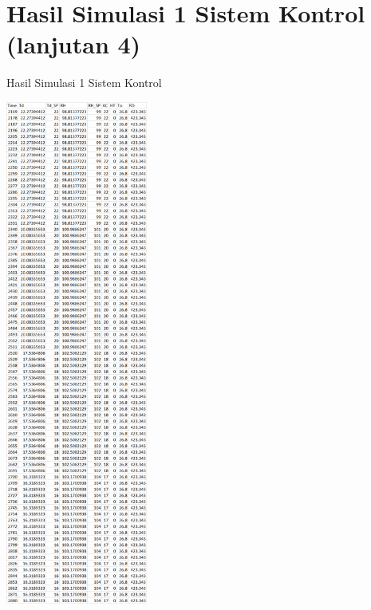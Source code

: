\section{Hasil Simulasi 1 Sistem Kontrol (lanjutan 4)}
\begin{table}[!h]
	\caption{Hasil Simulasi 1 Sistem Kontrol}
	\label{tbl:A:HasilSimulasiKontrol4}
	\centering
	\includegraphics[width=0.35\textwidth]{figures/HasilSimulasiSimulink4}
\end{table}

